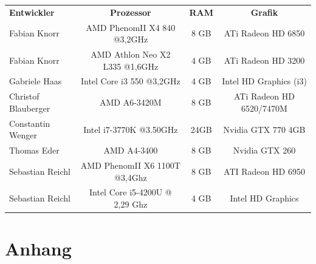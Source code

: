 \documentclass[10pt]{scrreprt}
\begin{document}
\vspace{0.5cm}

\begin{tabular}{l|c|c|c}
\textsf{\textbf{Entwickler}} & \textsf{\textbf{Prozessor}} & \textsf{\textbf{RAM}} & \textsf{\textbf{Grafik}} \\
Fabian Knorr & AMD PhenomII X4 840 @3,2GHz & 8 GB & ATi Radeon HD 6850 \\
Fabian Knorr & AMD Athlon Neo X2 L335 @1,6GHz & 4 GB & ATi Radeon HD 3200 \\
Gabriele Haas & Intel Core i3 550 @3,2GHz & 4 GB & Intel HD Graphics (i3) \\
Christof Blauberger & AMD A6-3420M & 8 GB & ATi Radeon HD 6520/7470M \\
Constantin Wenger & Intel i7-3770K @3.50GHz & 24GB & Nvidia GTX 770 4GB \\
Thomas Eder & AMD A4-3400 & 8 GB & Nvidia GTX 260 \\
Sebastian Reichl & AMD PhenomII X6 1100T @3,4Ghz & 8 GB & ATI Radeon HD 6950 \\
Sebastian Reichl & Intel Core i5-4200U @ 2,29 Ghz & 4 GB & Intel HD Graphics \\
\end{tabular}

\vspace{0.5cm}



\chapter{Anhang}
\end{document}
